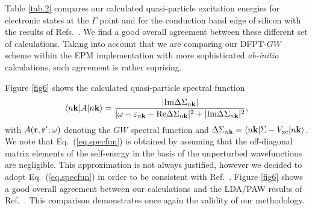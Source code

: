 \documentclass[twocolumn,prb,showpacs,superscriptaddress]{revtex4}
\def\w{\omega}
\def\E{\varepsilon}
\def\k{{\bf k}}
\def\r{{\bf r}}
\def\rp{{\bf r^\prime}}
\begin{document}
Table \ref{tab.2} compares our
calculated quasi-particle excitation energies for electronic states at the $\Gamma$ 
point and for the conduction band edge of silicon with the results of Refs.\ .
We find a good overall agreement between these different set of calculations.
Taking into account that we are comparing our DFPT-$GW$ scheme
within the EPM implementation with more sophisticated {\it ab-initio} calculations,
such agreement is rather suprising.

Figure \ref{fig6} shows the calculated quasi-particle spectral function 
  \begin{equation}\label{eq.specfun}
  \langle n\k| A|n\k\rangle = \frac{|{\rm Im} \Delta\Sigma_{n\k}|}
  {| \w-\E_{n\k} - {\rm Re}  \Delta\Sigma_{n\k} |^2 + | {\rm Im}  \Delta\Sigma_{n\k} |^2},
  \end{equation}
with $A(\r,\rp;\w)$ denoting the $GW$ spectral function and $\Delta \Sigma_{n\k} = \langle n\k| \Sigma - V_{\rm xc} |n\k\rangle$.
We note that Eq.\ (\ref{eq.specfun}) is obtained by assuming that the off-diagonal
matrix elements of the self-energy in the basis of the unperturbed
wavefunctions are negligible. This approximation is not always justified, however
we decided to adopt Eq.\ (\ref{eq.specfun}) in order to be consistent with Ref.\ .
Figure \ref{fig6} shows a good overall agreement between our calculations and the
LDA/PAW results of Ref.\ . This comparison demonstrates
once again the validity of our methodology.
\end{document}
